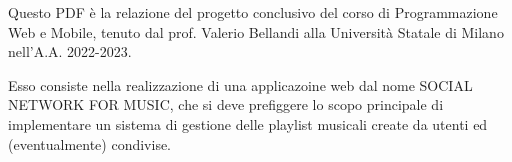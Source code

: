 Questo PDF è la relazione del progetto conclusivo del corso di Programmazione Web e Mobile, tenuto dal prof. Valerio Bellandi alla Università Statale di Milano nell'A.A. 2022-2023.

Esso consiste nella realizzazione di una applicazoine web dal nome \uppercase{Social Network for Music}, che si deve prefiggere lo scopo principale di implementare un sistema di gestione delle playlist musicali create da utenti ed (eventualmente) condivise.